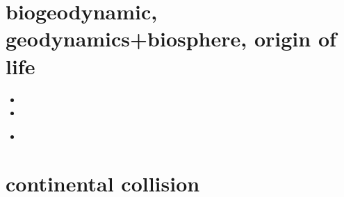 \section{biogeodynamic, geodynamics+biosphere, origin of life}

\begin{small}
\begin{itemize}
\item[\twothousandthirteen]
\item[\twothousandeighteen]
\item[\twothousandtwentythree]
 \\
\end{itemize}
\end{small}



\section{continental collision} 

